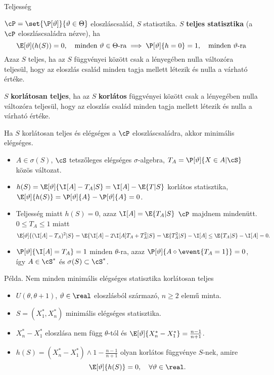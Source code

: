 \documentclass[aspectratio=169,notheorems,9pt,\option]{beamer}
\begin{document}
\begin{frame}{Teljesség}
  \begin{df}
    $\cP=\set{\P[\theta]}{\theta\in\Theta}$ eloszláscsalád, 
    $S$ statisztika. $S$ \textbf{teljes statisztika} (a $\cP$ eloszláscsaládra nézve), ha 
    \begin{displaymath}
      \E[\theta](h(S))=0,\quad\text{minden $\theta\in\Theta$-ra}\implies \P[\theta]{h=0}=1,\quad\text{minden $\theta$-ra}
    \end{displaymath} 
    Azaz $S$ teljes, ha az $S$ függvényei között csak a lényegében nulla változóra teljesül, hogy  
    az eloszlás család minden tagja mellett létezik és nulla a várható értéke.

    $S$ \textbf{korlátosan teljes}, ha az $S$ \textbf{korlátos} függvényei között csak a 
    lényegében nulla változóra teljesül, hogy  
    az eloszlás család minden tagja mellett létezik és nulla a várható értéke.
  \end{df}
  \begin{theorem}
    Ha $S$ korlátosan teljes és elégséges a $\cP$ eloszláscsaládra, akkor minimális elégséges. 
  \end{theorem}
  \begin{itemize}
    \item $A\in\sigma(S)$, $\cS$ tetszőleges elégséges $\sigma$-algebra, $T_A=\P[\theta]{X\in A|\cS}$ közös változat.
    \item $h(S)=\E[\theta]{\I[A]-T_A|S}=\I[A]-\E{T|S}$ korlátos statisztika, $\E[\theta]{h(S)}=\P[\theta]{A}-\P[\theta]{A}=0$.
    \item Teljesség miatt $h(S)=0$, azaz $\I[A]=\E{T_A|S}$ $\cP$ majdnem mindenütt. $0\leq T_A\leq 1$ miatt
    \begin{displaymath}
      \E[\theta]{(\I[A]-T_A)^2|S}=\E{\I[A]-2\I[A]T_A+T_A^2|S}= \E{T_A^2|S}-\I[A]\leq\E{T_A|S}-\I[A]=0.
    \end{displaymath}
    \item $\P[\theta]{\I[A]=T_A}=1$ minden $\theta$-ra, 
    azaz $\P[\theta]{A\circ \event{T_A=1}}=0$, így $A\in\cS^*$ és $\sigma(S)\subset\cS^*$.
  \end{itemize}  
\end{frame}


\begin{frame}{Példa. Nem minden minimális elégséges statisztika korlátosan teljes}
  \begin{itemize}
    \item $U(\theta,\theta+1)$, $\theta\in\real$ eloszlásból származó, $n\geq2$ elemű minta.
    \item $S=(X_1^*,X_n^*)$ minimális elégséges statisztika.
    \item $X_n^*-X_1^*$ eloszlása nem függ $\theta$-tól és $\E[\theta]{X_n^*-X_1^*}=\frac{n-1}{n+1}$.
    \item $h(S)=(X_n^*-X_1^*)\wedge1-\frac{n-1}{n+1}$ olyan korlátos függvénye $S$-nek, amire
    \begin{displaymath}
      \E[\theta]{h(S)}=0,\quad\forall \theta\in\real.
    \end{displaymath}
  \end{itemize}
\end{frame}
\end{document}
